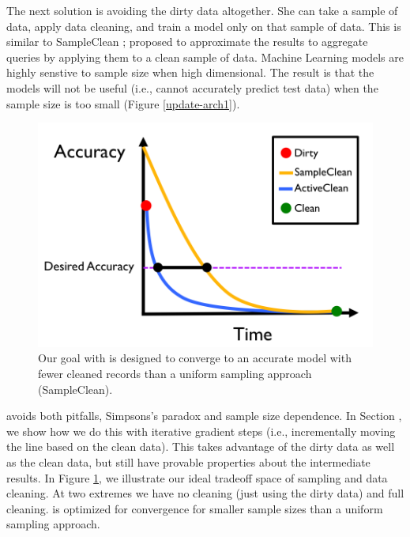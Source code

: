 The next solution is avoiding the dirty data altogether.
She can take a sample of data, apply data cleaning, and train a model only on that sample of data.
This is similar to SampleClean \cite{wang1999sample}; proposed to approximate the results to aggregate queries by applying them to a clean sample of data.
Machine Learning models are highly senstive to sample size when high dimensional.
The result is that the models will not be useful (i.e., cannot accurately predict test data) when the sample size is too small (Figure \ref{update-arch1}).

\begin{figure}[t]
\centering
 \includegraphics[width=0.6\columnwidth]{figs/arch2.png}
 \caption{Our goal with \sys is designed to converge to an accurate model with fewer cleaned records than a uniform sampling approach (SampleClean). \label{sys-arch2}}
\end{figure}

\sys avoids both pitfalls, Simpsons's paradox and sample size dependence.
In Section \label{model-update}, we show how we do this with iterative gradient steps (i.e., incrementally moving the line based on the clean data).
This takes advantage of the dirty data as well as the clean data, but still have provable properties about the intermediate results.
In Figure \ref{sys-arch2}, we illustrate our ideal tradeoff space of sampling and data cleaning.
At two extremes we have no cleaning (just using the dirty data) and full cleaning.
\sys is optimized for convergence for smaller sample sizes than a uniform sampling approach.

